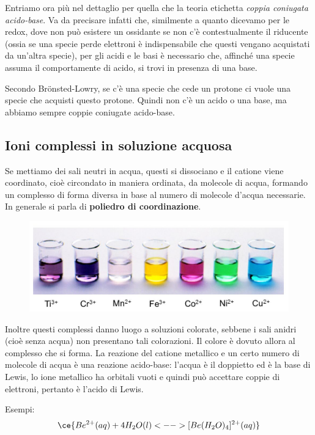 Entriamo ora più nel dettaglio per quella che la teoria etichetta \textit{coppia coniugata acido-base}. Va da precisare infatti che, similmente a quanto dicevamo per le redox, dove non può esistere un ossidante se non c'è contestualmente il riducente (ossia se una specie perde elettroni è indispensabile che questi vengano acquistati da un'altra specie), per gli acidi e le basi è necessario che, affinché una specie assuma il comportamente di acido, si trovi in presenza di una base.

Secondo Br\"{o}nsted-Lowry, se c'è una specie che cede un protone ci vuole una specie che acquisti questo protone. Quindi non c'è un acido o una base, ma abbiamo sempre coppie coniugate acido-base.

\subsection{Ioni complessi in soluzione acquosa}
Se mettiamo dei sali neutri in acqua, questi si dissociano e il catione viene coordinato, cioè circondato in maniera ordinata, da molecole di acqua, formando un complesso di forma diversa in base al numero di molecole d'acqua necessarie. In generale si parla di \textbf{poliedro di coordinazione}.

\begin{figure}[htp]
    \centering
    \includegraphics[width=12cm]{immagini/ioni_complessi.png}
\end{figure}

Inoltre questi complessi danno luogo a soluzioni colorate, sebbene i sali anidri (cioè senza acqua) non presentano tali colorazioni. Il colore è dovuto allora al complesso che si forma. La reazione del catione metallico e un certo numero di molecole di acqua è una reazione acido-base: l'acqua è il doppietto ed è la base di Lewis, lo ione metallico ha orbitali vuoti e quindi può accettare coppie di elettroni, pertanto è l'acido di Lewis.

\vspace{0.2cm}Esempi:
$$\ce{Be^{2+}(aq) + 4H_2O(l) <--> [Be(H_2O)_4]^{2+}(aq)}$$

